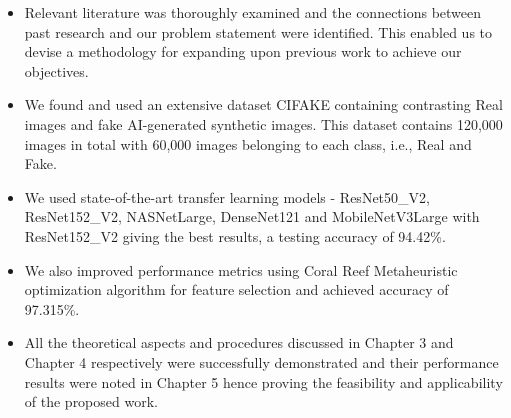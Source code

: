 

\begin{itemize}
    \item Relevant literature was thoroughly examined and the connections between past research and our problem statement were identified. This enabled us to devise a methodology for expanding upon previous work to achieve our objectives.
    \item We found and used an extensive dataset CIFAKE containing contrasting Real images and fake AI-generated synthetic images. This dataset contains 120,000 images in total with 60,000 images belonging to each class, i.e., Real and Fake.

    \item We used state-of-the-art transfer learning models - ResNet50\_V2, ResNet152\_V2, NASNetLarge, DenseNet121 and MobileNetV3Large with ResNet152\_V2 giving the best results, a testing accuracy of 94.42\%.

    \item We also improved performance metrics using Coral Reef Metaheuristic optimization algorithm for feature selection and achieved accuracy of 97.315\%.

    \item All the theoretical aspects and procedures discussed in Chapter 3 and Chapter 4 respectively were successfully demonstrated and their performance results were noted in Chapter 5 hence proving the feasibility and applicability of the proposed work.
\end{itemize}


\newpage